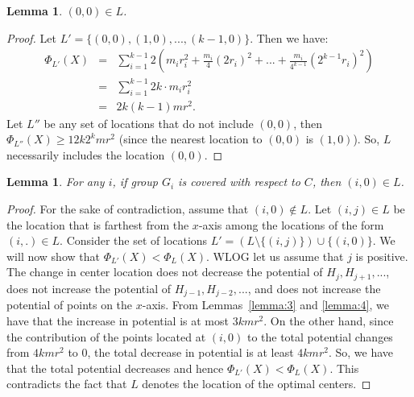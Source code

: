 \documentclass[11pt]{article}
\newtheorem{lemma}[theorem]{Lemma}
\begin{document}
\begin{lemma}
$(0, 0) \in L$.
\end{lemma}
\begin{proof}
Let $L' = \{(0, 0), (1, 0), ..., (k-1, 0)\}$. Then we have:
\begin{eqnarray*}
\Phi_{L'}(X) &=& \sum_{i=1}^{k-1} 2 \left(m_i r_i^2 + \frac{m_i}{4} (2 r_i)^2 + ... + \frac{m_i}{4^{k-1}} (2^{k-1}r_i)^2 \right)\\
 &=& \sum_{i=1}^{k-1} 2k \cdot m_i r_i^2 \\
 &=& 2k(k-1)m r^2.
\end{eqnarray*}
Let $L''$ be any set of locations that do not include $(0, 0)$, then $\Phi_{L''}(X) \geq 12k2^k m r^2$ (since the nearest location to $(0, 0)$ is $(1, 0)$).
So, $L$ necessarily includes the location $(0, 0)$.
\end{proof}

\begin{lemma}\label{lemma:axis}
For any $i$, if group $G_i$ is covered with respect to $C$, then $(i, 0) \in L$.
\end{lemma}
\begin{proof}
For the sake of contradiction, assume that $(i, 0) \notin L$. 
Let $(i, j) \in L$ be the location that is farthest from the $x$-axis among the locations of the form $(i, .) \in L$.
Consider the set of locations $L' = (L \setminus \{(i, j)\}) \cup \{(i, 0)\}$.
We will now show that $\Phi_{L'}(X) < \Phi_{L}(X)$.
WLOG let us assume that $j$ is positive.
The change in center location does not decrease the potential of $H_j, H_{j+1}, ...$, does not increase the potential of $H_{j-1}, H_{j-2}, ...$, and does not increase the potential of points on the $x$-axis. 
From Lemmas~\ref{lemma:3} and \ref{lemma:4}, we have that the increase in potential is at most $3kmr^2$. 
On the other hand, since the contribution of the points located at $(i, 0)$ to the total potential changes from $4kmr^2$ to $0$, the total decrease in potential is at least $4 k m r^2$. 
So, we have that the total potential decreases and hence $\Phi_{L'}(X) < \Phi_{L}(X)$. 
This contradicts the fact that $L$ denotes the location of the optimal centers.
\end{proof}
\end{document}
